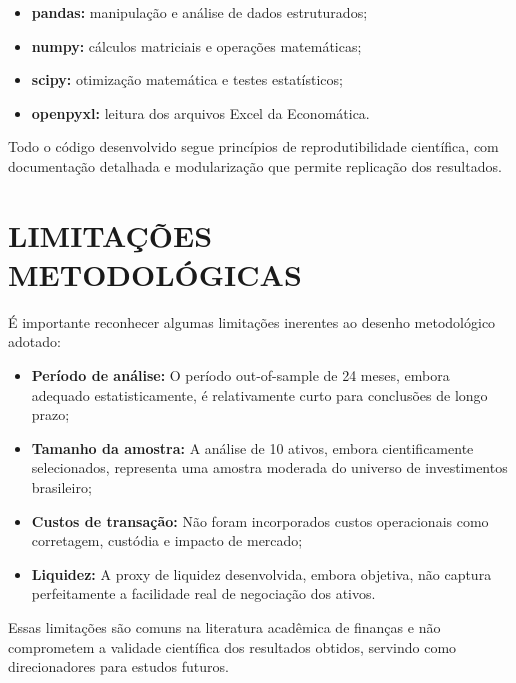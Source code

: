 \begin{itemize}
    \item \textbf{pandas:} manipulação e análise de dados estruturados;
    \item \textbf{numpy:} cálculos matriciais e operações matemáticas;
    \item \textbf{scipy:} otimização matemática e testes estatísticos;
    \item \textbf{openpyxl:} leitura dos arquivos Excel da Economática.
\end{itemize}

Todo o código desenvolvido segue princípios de reprodutibilidade científica, com documentação detalhada e modularização que permite replicação dos resultados.

\section{LIMITAÇÕES METODOLÓGICAS}

É importante reconhecer algumas limitações inerentes ao desenho metodológico adotado:

\begin{itemize}
    \item \textbf{Período de análise:} O período out-of-sample de 24 meses, embora adequado estatisticamente, é relativamente curto para conclusões de longo prazo;
    \item \textbf{Tamanho da amostra:} A análise de 10 ativos, embora cientificamente selecionados, representa uma amostra moderada do universo de investimentos brasileiro;
    \item \textbf{Custos de transação:} Não foram incorporados custos operacionais como corretagem, custódia e impacto de mercado;
    \item \textbf{Liquidez:} A proxy de liquidez desenvolvida, embora objetiva, não captura perfeitamente a facilidade real de negociação dos ativos.
\end{itemize}

Essas limitações são comuns na literatura acadêmica de finanças e não comprometem a validade científica dos resultados obtidos, servindo como direcionadores para estudos futuros.